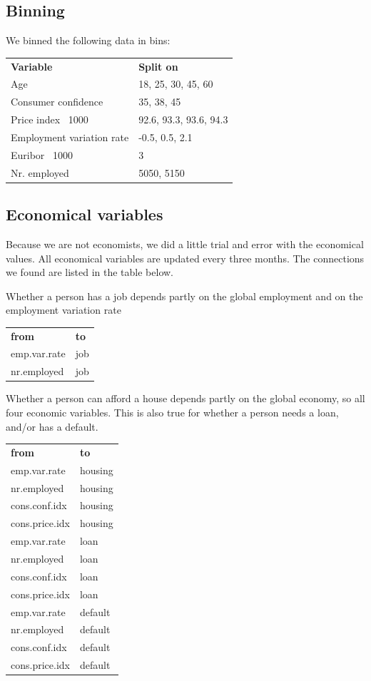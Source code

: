 \documentclass[11pt]{article}
\begin{document}
\begin{multicols}{2}
\subsection{Binning}
We binned the following data in bins:

\medskip
\begin{tabular}{ll}
    \textbf{Variable}           & \textbf{Split on} \\
    Age                         & 18, 25, 30, 45, 60 \\
    Consumer confidence         & 35, 38, 45 \\
    Price index \ 1000          & 92.6, 93.3, 93.6, 94.3 \\
    Employment variation rate   & -0.5, 0.5, 2.1 \\
    Euribor \ 1000              & 3 \\
    Nr. employed                & 5050, 5150 \\
\end{tabular}

\subsection{Economical variables}
Because we are not economists, we did a little trial and error with the
economical values. All economical variables are updated every three months. The
connections we found are listed in the table below. 

\bigskip
Whether a person has a job depends partly on the global employment and on the
employment variation rate

\medskip
\begin{tabular}{ll}
    \textbf{from} & \textbf{to} \\
    emp.var.rate & job\\
    nr.employed & job 
\end{tabular}

\bigskip
Whether a person can afford a house depends partly on the global economy, so all
four economic variables. This is also true for whether a person needs a loan,
and/or has a default. 

\medskip
\begin{tabular}{ll}
    \textbf{from} & \textbf{to} \\
    emp.var.rate & housing \\
    nr.employed & housing \\ 
    cons.conf.idx & housing \\ 
    cons.price.idx & housing \\ 
    \medskip
    emp.var.rate & loan \\
    nr.employed & loan \\ 
    cons.conf.idx & loan \\ 
    cons.price.idx & loan \\
    \medskip
    emp.var.rate & default \\
    nr.employed & default \\ 
    cons.conf.idx & default \\ 
    cons.price.idx & default \\ 
\end{tabular}


\end{multicols}
\end{document}
